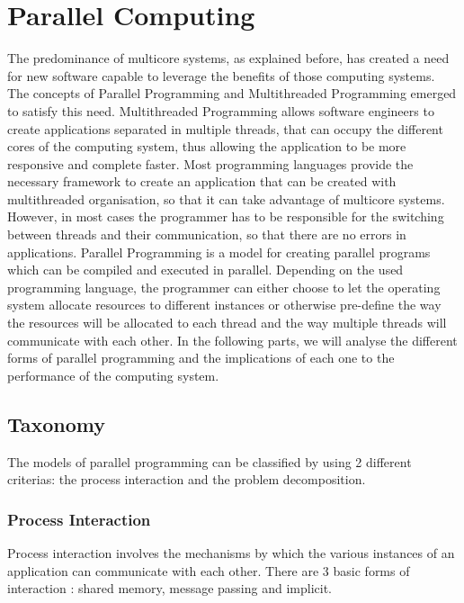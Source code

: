 \documentclass[diploma]{Styles/softlab-thesis}
\begin{document}
\section{Parallel Computing}

The predominance of multicore systems, as explained before, has created a need for new software capable to leverage the benefits of those computing systems. The concepts of Parallel Programming and Multithreaded Programming emerged to satisfy this need. Multithreaded Programming allows software engineers to create applications separated in multiple threads, that can occupy the different cores of the computing system, thus allowing the application to be more responsive and complete faster. Most programming languages provide the necessary framework to create an application that can be created with multithreaded organisation, so that it can take advantage of multicore systems. However, in most cases the programmer has to be responsible for the switching between threads and their communication, so that there are no errors in applications. Parallel Programming is a model for creating parallel programs which can be compiled and executed in parallel. Depending on the used programming language, the programmer can either choose to let the operating system allocate resources to different instances or otherwise pre-define the way the resources will be allocated to each thread and the way multiple threads will communicate with each other. In the following parts, we will analyse the different forms of parallel programming and the implications of each one to the performance of the computing system.

\subsection{Taxonomy}

The models of parallel programming can be classified by using 2 different criterias: the process interaction and the problem decomposition.

\subsubsection{Process Interaction}

Process interaction involves the mechanisms by which the various instances of an application can communicate with each other. There are 3 basic forms of interaction : shared memory, message passing and implicit. \\
\end{document}
